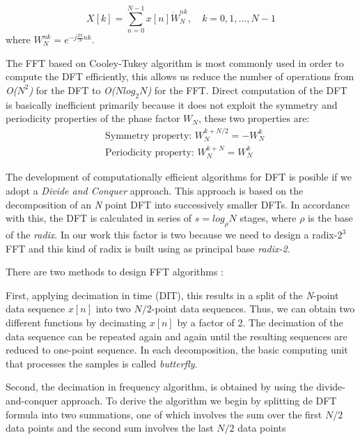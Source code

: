 \documentclass[journal,comsoc]{IEEEtran}
\begin{document}
\begin{equation}
	X[k] = \sum_{n=0}^{N-1} x[n] \dot W_N^{nk}, \quad k=0,1,...,N-1
\end{equation}
where $W_N^{nk} = e^{-j\frac{2\pi}{N} nk}$. 

The FFT based on Cooley-Tukey algorithm is most commonly used in order to compute the DFT efficiently, this allows us reduce the number of operations from \textit{O($N^2$)} for the DFT to \textit{O($Nlog_2N$)} for the FFT. Direct computation of the DFT is basically inefficient primarily because it does not exploit the symmetry and periodicity properties of the phase factor $W_N$, these two properties are:
\begin{align}
	&\text{Symmetry property: } W_N^{k+N/2} = -W_N^k	\\
	&\text{Periodicity property: } W_N^{k+N} = W_N^k
\end{align}

The development of computationally efficient algorithms for DFT is posible if we adopt a \textit{Divide and Conquer} approach. This approach is based on the decomposition of an \textit{N} point DFT into successively smaller DFTs. In accordance with this, the DFT is calculated in series of $s=log_\rho N$ stages, where $\rho$ is the base of the \textit{radix}. In our work this factor is two because we need to design a radix-$2^3$ FFT and this kind of radix is built using as principal base \textit{radix-2}.

There are two methods to design FFT algorithms \cite{proakis_digital_nodate,oppenheim_tratamiento_2011}: 

First, applying decimation in time (DIT), this results in a split of the \textit{N}-point data sequence $x[n]$ into two $N/2$-point data sequences. Thus, we can obtain two different functions by decimating $x[n]$ by a factor of 2. The decimation of the data sequence can be repeated again and again until the resulting sequences are reduced to one-point sequence. In each decomposition, the basic computing unit that processes the samples is called \textit{butterfly}.

Second, the decimation in frequency algorithm, is obtained by using the divide-and-conquer approach. To derive the algorithm we begin by splitting de DFT formula into two summations, one of which involves the sum over the first $N/2$ data points and the second sum involves the last $N/2$ data points  
\end{document}
